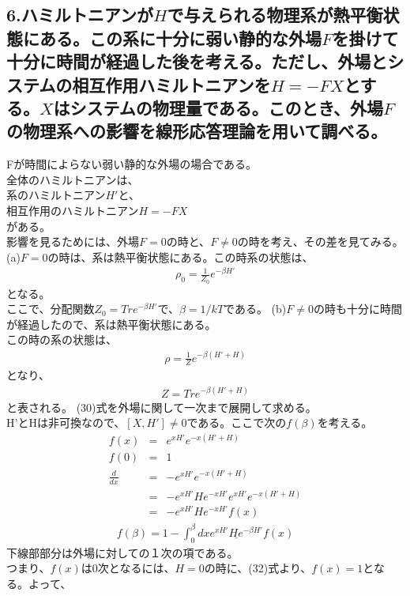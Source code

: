 \documentclass[10pt]{jreport}
\begin{document}
\subsection*{6.ハミルトニアンが$H$で与えられる物理系が熱平衡状態にある。この系に十分に弱い静的な外場$F$を掛けて十分に時間が経過した後を考える。ただし、外場とシステムの相互作用ハミルトニアンを$H=-FX$とする。$X$はシステムの物理量である。このとき、外場$F$の物理系への影響を線形応答理論を用いて調べる。}
Fが時間によらない弱い静的な外場の場合である。\\
全体のハミルトニアンは、\\
系のハミルトニアン$H'$と、\\
相互作用のハミルトニアン$H=-FX$ \\
がある。\\
影響を見るためには、外場$F=0$の時と、$F\neq0$の時を考え、その差を見てみる。\\
(a)$F=0$の時は、系は熱平衡状態にある。この時系の状態は、
\begin{eqnarray}
\rho_0 =\frac{1}{Z_0}e^{-\beta H'}
\end{eqnarray}
となる。\\
ここで、分配関数$Z_0=Tre^{-\beta H'}$で、$\beta =1/kT$である。
(b)$F\neq 0$の時も十分に時間が経過したので、系は熱平衡状態にある。\\
この時の系の状態は、
\begin{eqnarray}
\rho = \frac{1}{Z} e^{-\beta(H'+H)}
\end{eqnarray}
となり、
\begin{eqnarray}
Z = Tre^{-\beta(H'+H)}
\end{eqnarray}
と表される。
(30)式を外場に関して一次まで展開して求める。\\
H'とHは非可換なので、$[X,H']\neq 0$である。ここで次の$f(\beta)$を考える。
\begin{eqnarray}
f(x) &=& e^{x H'}e^{-x(H'+H)} \\
f(0)&=& 1 \nonumber \\
\frac{d}{dx} &=& -e^{x H'}e^{-x(H'+H)} \nonumber \\
&=& -e^{x H'}He^{-x H'}e^{x H'}e^{-x (H'+H)} \nonumber \\
&=& -e^{x H'}He^{-x H'}f(x) \nonumber 
\end{eqnarray}
\begin{eqnarray}
f(\beta) =1-\int^\beta_0 dx \underline{e^{xH'}He^{-\beta H'}}f(x)
\end{eqnarray}
下線部部分は外場に対しての１次の項である。\\
つまり、$f(x)$は0次となるには、$H=0$の時に、(32)式より、$f(x)=1$となる。よって、
\end{document}
